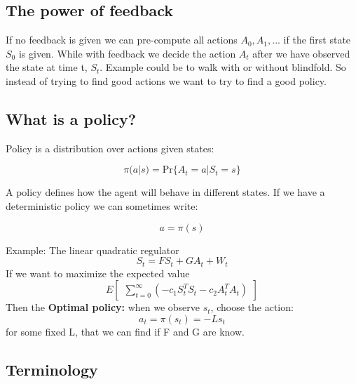 \subsection{The power of feedback}
If no feedback is given we can pre-compute all actions $A_0,A_1,...$ if the first state $S_0$ is given. While with feedback we decide the action $A_t$ after we have observed the state at time t, $S_t$. Example could be to walk with or without blindfold. So instead of trying to find good actions we want to try to find a good policy. 

\subsection{What is a policy?}
Policy is a distribution over actions given states:

	\begin{equation}
		\pi(a |s) = \text{Pr}\{ A_t = a | S_t = s\}
	\end{equation}

A policy defines how the agent will behave in different states. If we have a deterministic policy we can sometimes write:

	\begin{equation}
		a = \pi(s)
	\end{equation}

\begin{example}{Example: The linear quadratic regulator}
	\begin{equation}
		S_t = FS_t + GA_t + W_t
	\end{equation}
	If we want to maximize the expected value
	\begin{equation}
		E \begin{bmatrix} \sum_{t=0}^{\infty} (-c_1S_t^{T}S_t - c_2A_t^{T}A_t )\end{bmatrix}
	\end{equation}
	Then the \textbf{Optimal policy:} when we observe $s_t$, choose the action:
	\begin{equation}
		a_t = \pi(s_t) = -Ls_t
	\end{equation}
	for some fixed L, that we can find if F and G are know.
\end{example}	

\subsection{Terminology}

